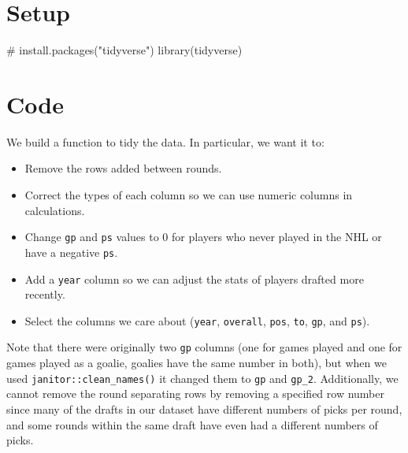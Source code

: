 \documentclass[
  letterpaper,
  DIV=11,
  numbers=noendperiod]{scrreprt}
\newenvironment{Shaded}{\begin{snugshade}}{\end{snugshade}}
\newcommand{\CommentTok}[1]{\textcolor[rgb]{0.37,0.37,0.37}{#1}}
\newcommand{\FunctionTok}[1]{\textcolor[rgb]{0.28,0.35,0.67}{#1}}
\newcommand{\NormalTok}[1]{\textcolor[rgb]{0.00,0.23,0.31}{#1}}
\begin{document}
\section{Setup}\label{setup-1}

\begin{Shaded}
\begin{Highlighting}[]
\CommentTok{\# install.packages("tidyverse")}
\FunctionTok{library}\NormalTok{(tidyverse)}
\end{Highlighting}
\end{Shaded}

\section{Code}\label{code-1}

We build a function to tidy the data. In particular, we want it to:

\begin{itemize}
\item
  Remove the rows added between rounds.
\item
  Correct the types of each column so we can use numeric columns in
  calculations.
\item
  Change \texttt{gp} and \texttt{ps} values to 0 for players who never
  played in the NHL or have a negative \texttt{ps}.
\item
  Add a \texttt{year} column so we can adjust the stats of players
  drafted more recently.
\item
  Select the columns we care about (\texttt{year}, \texttt{overall},
  \texttt{pos}, \texttt{to}, \texttt{gp}, and \texttt{ps}).
\end{itemize}

Note that there were originally two \texttt{gp} columns (one for games
played and one for games played as a goalie, goalies have the same
number in both), but when we used \texttt{janitor::clean\_names()} it
changed them to \texttt{gp} and \texttt{gp\_2}. Additionally, we cannot
remove the round separating rows by removing a specified row number
since many of the drafts in our dataset have different numbers of picks
per round, and some rounds within the same draft have even had a
different numbers of picks.
\end{document}
